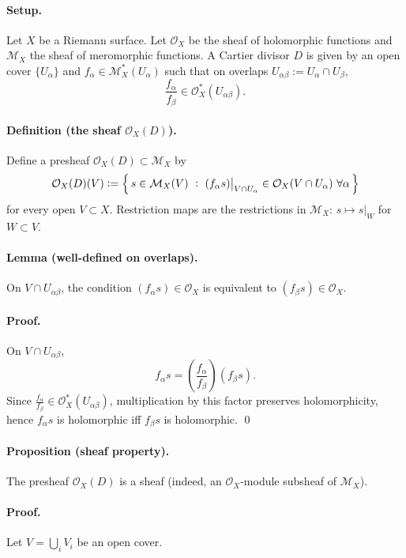 \documentclass[11pt,openany]{article}
\begin{document}
\paragraph{Setup.}
Let $X$ be a Riemann surface. Let $\mathcal O_X$ be the sheaf of holomorphic functions and
$\mathcal M_X$ the sheaf of meromorphic functions.
A Cartier divisor $D$ is given by an open cover $\{U_\alpha\}$ and $f_\alpha\in \mathcal M_X^*(U_\alpha)$
such that on overlaps $U_{\alpha\beta}:=U_\alpha\cap U_\beta$,
\[
\frac{f_\alpha}{f_\beta}\in \mathcal O_X^*(U_{\alpha\beta}).
\]

\paragraph{Definition (the sheaf $\mathcal O_X(D)$).}
Define a presheaf $\mathcal O_X(D)\subset \mathcal M_X$ by
\[
\mathcal O_X(D)(V)
:=
\Bigl\{\, s\in \mathcal M_X(V)\ :\ (f_\alpha s)\big|_{V\cap U_\alpha}\in \mathcal O_X(V\cap U_\alpha)\ \forall \alpha \,\Bigr\}
\]
for every open $V\subset X$. Restriction maps are the restrictions in $\mathcal M_X$:
$s\mapsto s|_W$ for $W\subset V$.

\paragraph{Lemma (well-defined on overlaps).}
On $V\cap U_{\alpha\beta}$, the condition $(f_\alpha s)\in\mathcal O_X$ is equivalent to
$(f_\beta s)\in\mathcal O_X$.

\paragraph{Proof.}
On $V\cap U_{\alpha\beta}$,
\[
f_\alpha s = \left(\frac{f_\alpha}{f_\beta}\right)(f_\beta s).
\]
Since $\frac{f_\alpha}{f_\beta}\in \mathcal O_X^*(U_{\alpha\beta})$, multiplication by this factor
preserves holomorphicity, hence $f_\alpha s$ is holomorphic iff $f_\beta s$ is holomorphic.
\qed

\paragraph{Proposition (sheaf property).}
The presheaf $\mathcal O_X(D)$ is a sheaf (indeed, an $\mathcal O_X$-module subsheaf of $\mathcal M_X$).

\paragraph{Proof.}
Let $V=\bigcup_i V_i$ be an open cover.
\end{document}
